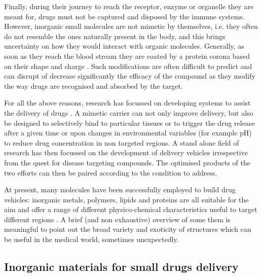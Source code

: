 Finally, during their journey to reach the receptor, enzyme or organelle they are meant for, drugs must not be captured and disposed by the immune systems. However, inorganic small molecules are not mimetic by themselves, i.e. they often do not resemble the ones naturally present in the body, and this brings uncertainty on how they would interact with organic molecules. Generally, as soon as they reach the blood stream they are coated by a protein corona based on their shape and charge \cite{Krol2012}. Such modifications are often difficult to predict and can disrupt of decrease significantly the efficacy of the compound as they modify the way drugs are recognised and absorbed by the target. 

For all the above reasons, research has focussed on developing systems to assist the delivery of drugs \cite{Jain2016, Pattni2015, Mitragotri2014}. A mimetic carrier can not only improve delivery, but also be designed to selectively bind to particular tissues or to trigger the drug release after a given time or upon changes in environmental variables (for example pH) to reduce drug concentration in non targeted regions. A stand alone field of research has then focussed on the development of delivery vehicles irrespective from the quest for disease targeting compounds. The optimised products of the two efforts can then be paired according to the condition to address.

At present, many molecules have been successfully employed to build drug vehicles: inorganic metals, polymers, lipids and proteins are all suitable for the aim and offer a range of different physico-chemical characteristics useful to target different regions \cite{Hughes2005}. A brief (and non exhaustive) overview of some them is meaningful to point out the broad variety and exoticity of structures which can be useful in the medical world, sometimes unexpectedly.


\subsection{Inorganic materials for small drugs delivery}

